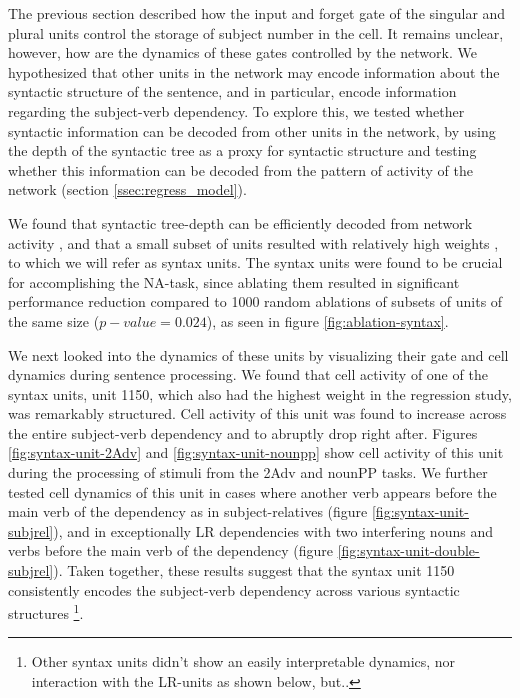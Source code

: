 The previous section described how the input and forget gate of the singular and plural units control the storage of subject number in the cell. It remains unclear, however, how are the dynamics of these gates controlled by the network. We hypothesized that other units in the network may encode information about the syntactic structure of the sentence, and in particular, encode information regarding the subject-verb dependency. To explore this, we tested whether syntactic information can be decoded from other units in the network, by using the depth of the syntactic tree as a proxy for syntactic structure  and testing whether this information can be decoded from the pattern of activity of the network (section \ref{ssec:regress_model}). 

We found that syntactic tree-depth can be efficiently decoded from network activity , and that a small subset of units resulted with relatively high weights , to which we will refer as syntax units. The syntax units were found to be crucial for accomplishing the NA-task, since ablating them resulted in significant performance reduction compared to 1000 random ablations of subsets of units of the same size ($p-value=0.024$), as seen in figure \ref{fig:ablation-syntax}. 

We next looked into the dynamics of these units by visualizing their gate and cell dynamics during sentence processing. We found that cell activity of one of the syntax units, unit 1150, which also had the highest weight in the regression study, was remarkably structured. Cell activity of this unit was found to increase across the entire subject-verb dependency and to abruptly drop right after. Figures \ref{fig:syntax-unit-2Adv} and \ref{fig:syntax-unit-nounpp} show cell activity of this unit during the processing of stimuli from the 2Adv and nounPP tasks. We further tested cell dynamics of this unit in cases where another verb appears before the main verb of the dependency as in subject-relatives (figure \ref{fig:syntax-unit-subjrel}), and in exceptionally LR dependencies with two interfering nouns and verbs before the main verb of the dependency (figure \ref{fig:syntax-unit-double-subjrel}). Taken together, these results suggest that the syntax unit 1150 consistently encodes the subject-verb dependency across various syntactic structures \footnote{Other syntax units didn't show an easily interpretable dynamics, nor interaction with the LR-units as shown below, but..}.